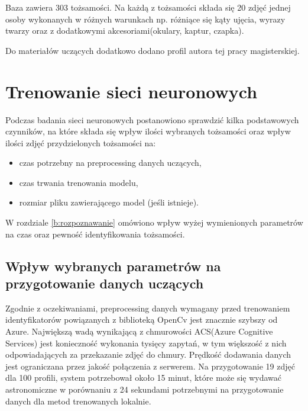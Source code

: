 Baza zawiera 303 tożsamości. Na każdą z tożsamości składa się 20 zdjęć jednej osoby wykonanych w różnych warunkach np. różniące się kąty ujęcia, wyrazy twarzy oraz z dodatkowymi akcesoriami(okulary, kaptur, czapka). 

Do materiałów uczących dodatkowo dodano profil autora tej pracy magisterskiej.

\section{Trenowanie sieci neuronowych}
Podczas badania sieci neuronowych postanowiono sprawdzić kilka podstawowych czynników, na które składa się wpływ ilości wybranych tożsamości oraz wpływ ilości zdjęć przydzielonych tożsamości na:
\begin{itemize}
\item czas potrzebny na preprocessing danych uczących,
\item czas trwania trenowania modelu,
\item rozmiar pliku zawierającego model (jeśli istnieje).
\end{itemize}
W rozdziale \ref{b:rozpoznawanie} omówiono wpływ wyżej wymienionych parametrów na czas oraz pewność identyfikowania tożsamości.

\subsection{Wpływ wybranych parametrów na przygotowanie danych uczących}
Zgodnie z oczekiwaniami, preprocessing danych wymagany przed trenowaniem identyfikatorów powiązanych z biblioteką OpenCv jest znacznie szybszy od Azure. Największą wadą wynikającą z chmurowości  ACS(Azure Cognitive Services) jest konieczność wykonania tysięcy zapytań, w tym większość z nich odpowiadających za przekazanie zdjęć do chmury. Prędkość dodawania danych jest ograniczana przez jakość połączenia z serwerem. Na przygotowanie 19 zdjęć dla 100 profili, system potrzebował około 15 minut, które może się wydawać astronomiczne w porównaniu z 24 sekundami potrzebnymi na przygotowanie danych dla metod trenowanych lokalnie.

